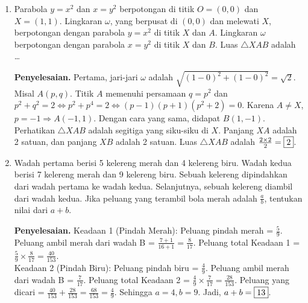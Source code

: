 \documentclass[12pt]{scrartcl}
\begin{document}
\begin{enumerate}
    \textbf{Penyelesaian.} Nilai tersebut ekuivalen dengan mencari digit pertama dari 3 digit akhir dari $\frac{2019}{2^{2019}} \times 10^{2019} = 2019 \times 5^{2019} = 13 \times 31 \times 5^{2019}$. Akan dicari dengan modulo sehingga $13 \times 31 \times 5^{2019} \equiv x \pmod{1000}$. 
    Bagi menjadi 2 kasus:
    $x \equiv 13 \times 31 \times 5^{2019} \pmod{8} \equiv -3 \times (-1) \times 625^{504} \times 125 \pmod{8} \equiv 15 \times 1^{504} \equiv 7 \pmod{8}$.
    Juga $x \equiv 13 \times 31 \times 5^{2019} \pmod{125} \equiv 0 \pmod{125}$.
    Gabung kasus: karena kelipatan 125 maka $x=125a$. Tinjau $125a \equiv 7 \pmod{8} \Rightarrow 5a \equiv 15 \pmod{8} \Rightarrow a \equiv 3 \pmod{8} \Rightarrow a = 8b+3$.
    Jadi, $x = 125(8b+3) = 1000b + 375 \equiv 375 \pmod{1000}$. Digit pertama dari 3 digit akhir tersebut adalah .
    
    \item Parabola $y=x^2$ dan $x=y^2$ berpotongan di titik $O=(0,0)$ dan $X=(1,1)$. Lingkaran $\omega$, yang berpusat di $(0,0)$ dan melewati $X$, berpotongan dengan parabola $y=x^2$ di titik $X$ dan $A$. Lingkaran $\omega$ berpotongan dengan parabola $x=y^2$ di titik $X$ dan $B$. Luas $\triangle XAB$ adalah \dots
    
    \textbf{Penyelesaian.} Pertama, jari-jari $\omega$ adalah $\sqrt{(1-0)^2+(1-0)^2} = \sqrt{2}$. Misal $A(p,q)$. Titik $A$ memenuhi persamaan $q=p^2$ dan $p^2+q^2=2 \iff p^2+p^4=2 \iff (p-1)(p+1)(p^2+2)=0$. Karena $A \ne X$, $p=-1 \Rightarrow A(-1,1)$.
    Dengan cara yang sama, didapat $B(1,-1)$. Perhatikan $\triangle XAB$ adalah segitiga yang siku-siku di $X$. Panjang $XA$ adalah 2 satuan, dan panjang $XB$ adalah 2 satuan. Luas $\triangle XAB$ adalah $\frac{2 \times 2}{2} = \fbox{2}$.
    
    \item Wadah pertama berisi 5 kelereng merah dan 4 kelereng biru. Wadah kedua berisi 7 kelereng merah dan 9 kelereng biru. Sebuah kelereng dipindahkan dari wadah pertama ke wadah kedua. Selanjutnya, sebuah kelereng diambil dari wadah kedua. Jika peluang yang terambil bola merah adalah $\frac{a}{b}$, tentukan nilai dari $a+b$.
    
    \textbf{Penyelesaian.} 
    Keadaan 1 (Pindah Merah): Peluang pindah merah = $\frac{5}{9}$. Peluang ambil merah dari wadah B = $\frac{7+1}{16+1} = \frac{8}{17}$. Peluang total Keadaan 1 = $\frac{5}{9} \times \frac{8}{17} = \frac{40}{153}$.\\
    Keadaan 2 (Pindah Biru): Peluang pindah biru = $\frac{4}{9}$. Peluang ambil merah dari wadah B = $\frac{7}{17}$. Peluang total Keadaan 2 = $\frac{4}{9} \times \frac{7}{17} = \frac{28}{153}$.
    Peluang yang dicari = $\frac{40}{153} + \frac{28}{153} = \frac{68}{153} = \frac{4}{9}$. Sehingga $a=4, b=9$. Jadi, $a+b = \fbox{13}$.
    

\end{enumerate}
\end{document}
